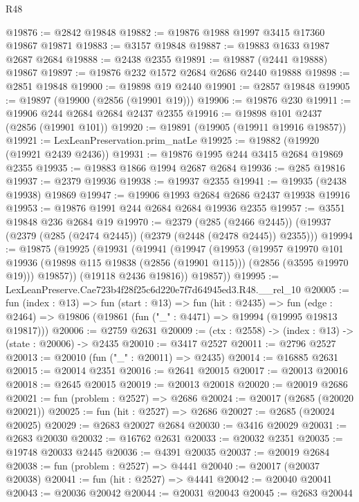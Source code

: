 \begin{lexlean}{R48}
\begin{coremodule}
@19876 := @2842 @19848
@19882 := @19876 @1988 @1997 @3415 @17360 @19867 @19871
@19883 := @3157 @19848
@19887 := @19883 @1633 @1987 @2687 @2684
@19888 := @2438 @2355
@19891 := @19887 (@2441 @19888) @19867
@19897 := @19876 @232 @1572 @2684 @2686 @2440 @19888
@19898 := @2851 @19848
@19900 := @19898 @19 @2440
@19901 := @2857 @19848
@19905 := @19897 (@19900 (@2856 (@19901 @19)))
@19906 := @19876 @230
@19911 := @19906 @244 @2684 @2684 @2437 @2355
@19916 := @19898 @101 @2437 (@2856 (@19901 @101))
@19920 := @19891 (@19905 (@19911 @19916 @19857))
@19921 := LexLeanPreservation.prim_natLe
@19925 := @19882 (@19920 (@19921 @2439 @2436))
@19931 := @19876 @1995 @244 @3415 @2684 @19869 @2355
@19935 := @19883 @1866 @1994 @2687 @2684
@19936 := @285 @19816
@19937 := @2379 @19936
@19938 := @19937 @2355
@19941 := @19935 (@2438 @19938) @19869
@19947 := @19906 @1993 @2684 @2686 @2437 @19938 @19916
@19953 := @19876 @1991 @244 @2684 @2684 @19936 @2355
@19957 := @3551 @19848 @236 @2684 @19
@19970 := @2379
    (@285 (@2466 @2445))
    (@19937 (@2379 (@285 (@2474 @2445)) (@2379 (@2448 (@2478 @2445)) @2355)))
@19994 := @19875
    (@19925
      (@19931
        (@19941
          (@19947
            (@19953
              (@19957
                @19970
                @101
                @19936
                (@19898 @115 @19838 (@2856 (@19901 @115)))
                (@2856 (@3595 @19970 @19)))
              @19857))
          (@19118 @2436 @19816))
        @19857))
@19995 := LexLeanPreserve.Cae723b4f28f25c6d220e7f7d64945ed3.R48.__rel_10
@20005 := fun (index : @13) =>
  fun (start : @13) =>
  fun (hit : @2435) =>
  fun (edge : @2464) => @19806 (@19861 (fun ("_" : @4471) => @19994 (@19995 @19813 @19817)))
@20006 := @2759 @2631
@20009 := (ctx : @2558) -> (index : @13) -> (state : @20006) -> @2435
@20010 := @3417 @2527
@20011 := @2796 @2527
@20013 := @20010 (fun ("_" : @20011) => @2435)
@20014 := @16885 @2631
@20015 := @20014 @2351
@20016 := @2641 @20015
@20017 := @20013 @20016
@20018 := @2645 @20015
@20019 := @20013 @20018
@20020 := @20019 @2686
@20021 := fun (problem : @2527) => @2686
@20024 := @20017 (@2685 (@20020 @20021))
@20025 := fun (hit : @2527) => @2686
@20027 := @2685 (@20024 @20025)
@20029 := @2683 @20027 @2684
@20030 := @3416 @20029
@20031 := @2683 @20030
@20032 := @16762 @2631
@20033 := @20032 @2351
@20035 := @19748 @20033 @2445
@20036 := @4391 @20035
@20037 := @20019 @2684
@20038 := fun (problem : @2527) => @4441
@20040 := @20017 (@20037 @20038)
@20041 := fun (hit : @2527) => @4441
@20042 := @20040 @20041
@20043 := @20036 @20042
@20044 := @20031 @20043
@20045 := @2683 @20044

\end{coremodule}
\end{lexlean}
